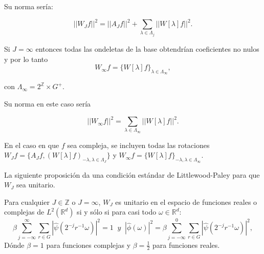 \noindent Su norma sería: 

\begin{equation}
  ||W_Jf||^2=||A_Jf||^2+\sum_{\lambda \in \Lambda_j} ||W[\lambda]f||^2.
\end{equation}

\medskip
 
\noindent Si $J=\infty$ entonces todas las ondeletas de la base obtendrían coeficientes no nulos y por lo tanto 
$$W_\infty f=\lbrace W[\lambda]f\rbrace_{\lambda \in \Lambda_\infty},$$ 

\noindent con $\Lambda_\infty=2^\mathbb{Z} \times G^{+}$. 

\noindent Su norma en este caso sería 

$$||W_\infty f||^2=\sum_{\lambda \in \Lambda_\infty} ||W[\lambda]f||^2.$$

\noindent En el caso en que $f$ sea compleja, se incluyen todas las rotaciones $W_Jf=\lbrace A_J f,(W[\lambda]f)_{-\lambda,\lambda \in \Lambda_J} \rbrace$ y $W_\infty f=\lbrace W[\lambda]f\rbrace_{-\lambda,\lambda \in \Lambda_\infty}$. 

\medskip

\noindent La siguiente proposición da una condición estándar de Littlewood-Paley para que $W_J$ sea unitario.

\begin{proposicion} \label{unitario}
 Para cualquier $J \in \mathbb{Z}$ o $J=\infty$, $W_J$ es unitario en el espacio de funciones reales o complejas de $L^2(\mathbb{R}^d)$ si y sólo si para casi todo $\omega \in \mathbb{R}^d$: 
    \begin{equation}\label{eq::1.2}
        \beta \sum_{j=-\infty}^\infty \sum_{r \in G} |\widehat{\psi}(2^{-j}r^{-1}\omega)|^2=1 \; \; y
        \;\;|\widehat{\phi}(\omega)|^2= \beta \sum_{j=-\infty}^0 \sum_{r\in G} |\widehat{\psi}(2^{-j}r^{-1}\omega)|^2,
    \end{equation}
 Dónde $\beta=1$ para funciones complejas y $\beta=\frac{1}{2}$ para funciones reales.
\end{proposicion}

